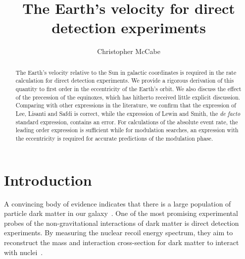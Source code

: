 \documentclass[preprintnumbers,a4paper,twocolumn,floats,nofootinbib,superscriptaddress,aps,prd]{revtex4-1}
\begin{document}
\title{The Earth's velocity for direct detection experiments}


\author{Christopher McCabe}

\begin{abstract} 
The Earth's velocity relative to the Sun in galactic coordinates is required in the rate calculation for direct detection experiments. We provide a rigorous derivation of this quantity to first order in the eccentricity of the Earth's orbit. We also discuss the effect of the precession of the equinoxes, which has hitherto received little explicit discussion. Comparing with other expressions in the literature, we confirm that the expression of Lee, Lisanti and Safdi is correct, while the expression of Lewin and Smith, the {\it de facto} standard expression, contains an error. For calculations of the absolute event rate, the leading order expression is sufficient while for modulation searches, an expression with the eccentricity is required for accurate predictions of the modulation phase. \end{abstract} 

\maketitle


\section{Introduction}

A convincing body of evidence indicates that there is a large population of particle dark matter in our galaxy~\cite{Bovy:2012tw}. One of the most promising experimental probes of the non-gravitational interactions of dark matter is direct detection experiments. By measuring the nuclear recoil energy spectrum, they aim to reconstruct the mass and interaction cross-section for dark matter to interact with nuclei~\cite{Goodman:1984dc}. 
\end{document}
